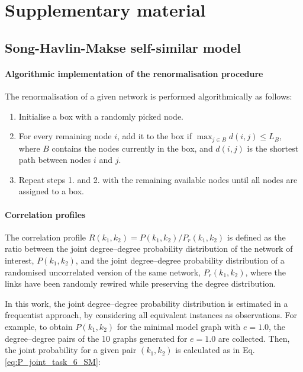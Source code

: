\chapter{Supplementary material}

\section{Song-Havlin-Makse self-similar model}
\label{sec:SHM_SM}
 
\subsubsection*{Algorithmic implementation of the renormalisation procedure}
The renormalisation of a given network is performed algorithmically as follows:

\begin{enumerate}
	\item Initialise a box with a randomly picked node.
	\item For every remaining node $i$, add it to the box if $\max_{j\in B} d(i,j) \leq L_B$, where $B$ contains the nodes currently in the box, and $d(i,j)$ is the shortest path between nodes $i$ and $j$.
	\item Repeat steps 1. and 2. with the remaining available nodes until all nodes are assigned to a box.
\end{enumerate}

\subsubsection*{Correlation profiles}

The correlation profile $R(k_1, k_2) = P(k_1, k_2) / P_r(k_1, k_2)$ is defined as the ratio between the joint degree--degree probability distribution of the network of interest, $P(k_1, k_2)$, and the joint degree--degree probability distribution of a randomised uncorrelated version of the same network, $P_r(k_1, k_2)$, where the links have been randomly rewired while preserving the degree distribution. 

In this work, the joint degree--degree probability distribution is estimated in a frequentist approach, by considering all equivalent instances as observations. For example, to obtain $P(k_1, k_2)$ for the minimal model graph with $e=1.0$, the degree--degree pairs of the 10 graphs generated for $e=1.0$ are collected. Then, the joint probability for a given pair $(k_1, k_2)$ is calculated as in Eq. \ref{eq:P_joint_task_6_SM}:

